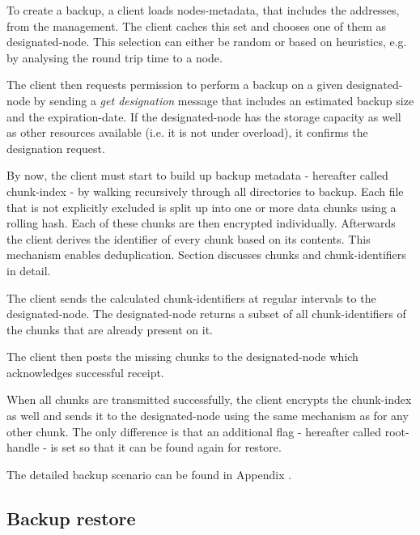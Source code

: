 To create a backup, a \gls{client} loads \glspl{node}-metadata, that includes the addresses, from the \gls{management}. The \gls{client} caches this set and chooses one of them as \gls{designated-node}. This selection can either be random or based on heuristics, e.g. by analysing the round trip time to a \gls{node}.

The \gls{client} then requests permission to perform a backup on a given \gls{designated-node} by sending a \emph{get designation} message that includes an estimated backup size and the \gls{expiration-date}. If the \gls{designated-node} has the storage capacity as well as other resources available (i.e. it is not under overload), it confirms the designation request.

By now, the \gls{client} must start to build up backup metadata - hereafter called \gls{chunk-index} - by walking recursively through all directories to backup. Each file that is not explicitly excluded is split up into one or more data \glspl{chunk} using a rolling hash\cite{borg-data-structures}. Each of these \glspl{chunk} are then encrypted individually. Afterwards the \gls{client} derives the identifier of every \gls{chunk} based on its contents. This mechanism enables deduplication. Section  discusses \glspl{chunk} and \glspl{chunk-identifier} in detail.

The \gls{client} sends the calculated \glspl{chunk-identifier} at regular intervals to the \gls{designated-node}. The \gls{designated-node} returns a subset of all \glspl{chunk-identifier} of the \glspl{chunk} that are already present on it.

The \gls{client} then posts the missing \glspl{chunk} to the \gls{designated-node} which acknowledges successful receipt.

When all \glspl{chunk} are transmitted successfully, the client encrypts the \gls{chunk-index} as well and sends it to the \gls{designated-node} using the same mechanism as for any other \gls{chunk}. The only difference is that an additional flag - hereafter called \gls{root-handle} - is set so that it can be found again for restore.

The detailed backup scenario can be found in Appendix .

\subsection{Backup restore}

